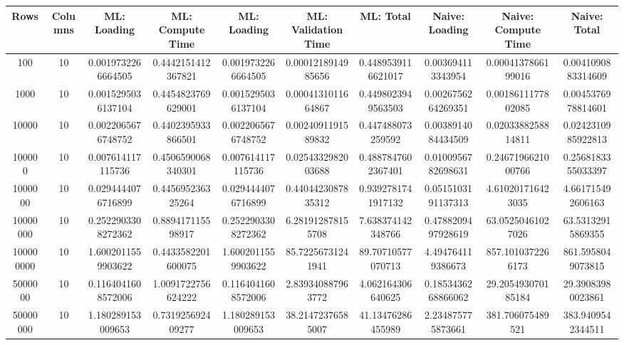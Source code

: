 \begin{table}[htb]
    \centering
    \begin{tabular}{@{}cccccccccc@{}}
        \toprule
        Rows & Columns & ML: Loading & ML: Compute Time & ML: Loading & ML: Validation Time & ML: Total & Naive: Loading & Naive: Compute Time & Naive: Total \\
        \midrule
        100 & 10 & 0.0019732266664505 & 0.4442151412367821 & 0.0019732266664505 & 0.0001218914985656 & 0.4489539116621017 & 0.003694113343954 & 0.0004137866199016 & 0.0041090883314609 \\
        1000 & 10 & 0.0015295036137104 & 0.4454823769629001 & 0.0015295036137104 & 0.0004131011664867 & 0.4498023949563503 & 0.0026756264269351 & 0.0018611177802085 & 0.0045376978814601 \\
        10000 & 10 & 0.0022065676748752 & 0.4402395933866501 & 0.0022065676748752 & 0.0024091191589832 & 0.447488073259592 & 0.0038914084434509 & 0.0203388258814811 & 0.0242310985922813 \\
        100000 & 10 & 0.007614117115736 & 0.4506590068340301 & 0.007614117115736 & 0.0254332982003688 & 0.4887847602367401 & 0.0100956782698631 & 0.2467196621000766 & 0.2568183355033397 \\
        1000000 & 10 & 0.0294444076716899 & 0.445695236325264 & 0.0294444076716899 & 0.4404423087835312 & 0.9392781741917132 & 0.0515103191137313 & 4.610201716423035 & 4.661715492606163 \\
        10000000 & 10 & 0.2522903308272362 & 0.889417115598917 & 0.2522903308272362 & 6.281912878155708 & 7.638374142348766 & 0.4788209497928619 & 63.05250461027026 & 63.53132915869355 \\
        100000000 & 10 & 1.6002011559903622 & 0.4433582201600075 & 1.6002011559903622 & 85.72256731241941 & 89.70710577070713 & 4.494764119386673 & 857.1010372266173 & 861.5958049073815 \\
        5000000 & 10 & 0.1164041608572006 & 1.0091722756624222 & 0.1164041608572006 & 2.839340887963772 & 4.062164306640625 & 0.1853436268866062 & 29.205493070185184 & 29.39083980023861 \\
        50000000 & 10 & 1.180289153009653 & 0.731925692409277 & 1.180289153009653 & 38.21472376585007 & 41.13476286455989 & 2.234875775873661 & 381.706075489521 & 383.9409542344511 \\
        \bottomrule
    \end{tabular}
\end{table}